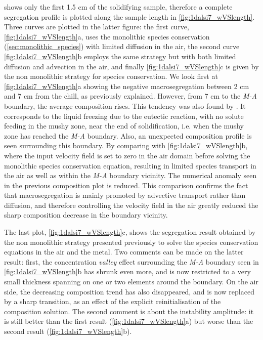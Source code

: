  shows only the first 1.5 cm of the solidifying sample, 
therefore a complete segregation profile is plotted along the sample length in \cref{fig:1dalsi7_wVSlength}.
Three curves are plotted in the latter figure: the first curve, \cref{fig:1dalsi7_wVSlength}a, uses the monolithic species conservation (\cref{sec:monolithic_species})
with limited diffusion in the air, the second curve \cref{fig:1dalsi7_wVSlength}b employs the same strategy but with both limited diffusion and advection in the air, and
finally \cref{fig:1dalsi7_wVSlength}c is given by the non monolithic strategy for species conservation.
We look first at \cref{fig:1dalsi7_wVSlength}a showing the negative macrosegregation between 2 cm and 7 cm from the chill, as previously explained.
However, from 7 cm to the \emph{M-A} boundary, the average composition rises.
This tendency was also found by \citet{niane_etude_2004}. It corresponds to the liquid freezing due to the eutectic reaction, with no solute feeding in the mushy zone, 
near the end of solidification, i.e. when the mushy zone has reached the \emph{M-A} boundary.
Also, an unexpected composition profile is seen surrounding this boundary. 
By comparing with \cref{fig:1dalsi7_wVSlength}b, where the input velocity field is set to zero in the air domain before solving the monolithic species conservation equation,
resulting in limited species transport in the air as well as within the \emph{M-A} boundary vicinity. The numerical anomaly seen in the previous composition plot is reduced.
This comparison confirms the fact that macrosegregation is mainly promoted by advective transport rather than diffusion, and therefore controlling the velocity field in the air greatly reduced the sharp
composition decrease in the boundary vicinity.

The last plot, \cref{fig:1dalsi7_wVSlength}c, shows the segregation result obtained by the non monolithic strategy presented previously to solve the species conservation equations
in the air and the metal. Two comments can be made on the latter result: first, the concentration \emph{valley} effect surrounding the \emph{M-A} boundary seen in 
\cref{fig:1dalsi7_wVSlength}b has shrunk even more, and is now restricted to a very small thickness spanning on one or two elements around the boundary.
On the air side, the decreasing composition trend has also disappeared, and is now replaced by a sharp transition, as an effect of the explicit reinitialisation of 
the composition solution. The second comment is about the instability amplitude: it is still better than the first result (\cref{fig:1dalsi7_wVSlength}a) 
but worse than the second result (\cref{fig:1dalsi7_wVSlength}b).

